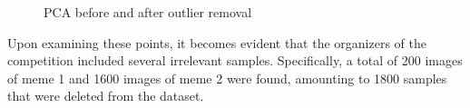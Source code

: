 \documentclass[11pt]{article}
\begin{document}
\begin{multicols}{2}
        \begin{figure}[H]
        \centering
        \caption{PCA before and after outlier removal}
        \label{fig:fig1}
        \end{figure}
        
        Upon examining these points, it becomes evident that the organizers of the competition included several irrelevant samples. Specifically, a total of 200 images of meme 1 and 1600 images of meme 2 were found, amounting to 1800  samples that were deleted from the dataset. %

        


        

\end{multicols}
\end{document}
